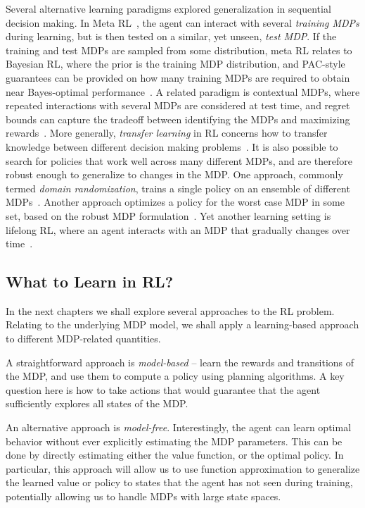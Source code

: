 Several alternative learning paradigms explored generalization in sequential decision making. In Meta RL~\cite{beck2023survey}, the agent can interact with several \textit{training MDPs} during learning, but is then tested on a similar, yet unseen, \textit{test MDP}. If the training and test MDPs are sampled from some distribution, meta RL relates to Bayesian RL, where the prior is the training MDP distribution, and PAC-style guarantees can be provided on how many training MDPs are required to obtain near Bayes-optimal performance~\cite{tamar2022regularization}. A related paradigm is contextual MDPs, where repeated interactions with several MDPs are considered at test time, and regret bounds can capture the tradeoff between identifying the MDPs and maximizing rewards~\cite{hallak2015contextual}.
More generally, \textit{transfer learning} in RL concerns how to transfer knowledge between different decision making problems~\cite{taylor2009transfer,kirk2023survey}.
It is also possible to search for policies that work well across many different MDPs, and are therefore robust enough to generalize to changes in the MDP. One approach, commonly termed \textit{domain randomization}, trains a single policy on an ensemble of different MDPs~\cite{tobin2017domain}. Another approach optimizes a policy for the worst case MDP in some set, based on the robust MDP formulation~\cite{nilim2005robust}. Yet another learning setting is lifelong RL, where an agent interacts with an MDP that gradually changes over time~\cite{khetarpal2022towards}.


\subsection{What to Learn in RL?}
In the next chapters we shall explore several approaches to the RL problem. Relating to the underlying MDP model, we shall apply a learning-based approach to different MDP-related quantities. 

A straightforward approach is \textit{model-based} -- learn the rewards and transitions of the MDP, and use them to compute a policy using planning algorithms. A key question here is how to take actions that would guarantee that the agent sufficiently explores all states of the MDP.

An alternative approach is \textit{model-free}. Interestingly, the agent can learn optimal behavior without ever explicitly estimating the MDP parameters. This can be done by directly estimating either the value function, or the optimal policy. In particular, this approach will allow us to use function approximation to generalize the learned value or policy to states that the agent has not seen during training, potentially allowing us to handle MDPs with large state spaces.

